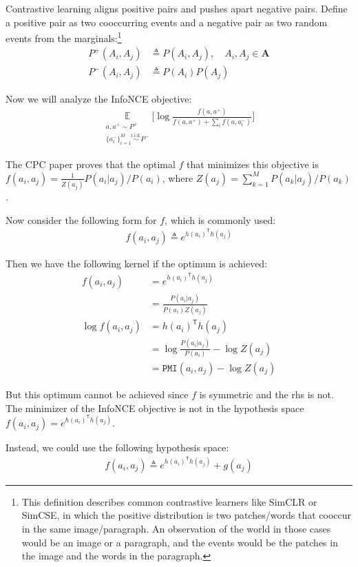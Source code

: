 \documentclass{article}
\theoremstyle{plain}
\theoremstyle{definition}
\theoremstyle{remark}
\newcommand{\transpose}{\mathsf{T}}
\newcommand*{\iidsim}{\overset{\text{i.i.d.}}{\sim}}
\begin{document}
Contrastive learning aligns positive pairs and pushes apart negative pairs. Define a positive pair as two cooccurring events and a negative pair as two random events from the marginals:\footnote{This definition describes common contrastive learners like SimCLR or SimCSE, in which the positive distribution is two patches/words that cooccur in the same image/paragraph. An observation of the world in those cases would be an image or a paragraph, and the events would be the patches in the image and the words in the paragraph.}
\begin{align}
    P^+(A_i,A_j) &\triangleq P(A_i,A_j), \quad A_i, A_j \in \mathbf{A}\\
    P^-(A_i,A_j) &\triangleq P(A_i)P(A_j)
\end{align}

Now we will analyze the InfoNCE objective:
\begin{align}
    \underset{\substack{
    a,a^+ \sim P^+ \\
    \{a^-_i\}_{i=1}^{M} \iidsim P^-
    }}{\mathbb{E}} \Bigg[\log \frac{f(a,a^+)}{f(a,a^+) + \sum_i f(a,a_i^-)} \Bigg]
\end{align}


The CPC paper proves that the optimal $f$ that minimizes this objective is $f(a_i,a_j) = \frac{1}{Z(a_j)}P(a_i | a_j)/P(a_i)$, where $Z(a_j) = \sum_{k=1}^M P(a_k | a_j)/P(a_k)$.

Now consider the following form for $f$, which is commonly used:
\begin{align}
    f(a_i,a_j) \triangleq e^{h(a_i)^\transpose h(a_j)}
\end{align}

Then we have the following kernel if the optimum is achieved:
\begin{align}
    f(a_i,a_j) &= e^{h(a_i)^\transpose h(a_j)}\\
    &= \frac{P(a_i | a_j)}{P(a_i)Z(a_j)}\\
    \log f(a_i,a_j) &= h(a_i)^\transpose h(a_j)\\
    &= \log \frac{P(a_i | a_j)}{P(a_i)} - \log Z(a_j)\\
    &= \texttt{PMI}(a_i,a_j) - \log Z(a_j)
\end{align}

But this optimum cannot be achieved since $f$ is symmetric and the rhs is not. The minimizer of the InfoNCE objective is not in the hypothesis space $f(a_i, a_j) = e^{h(a_i)^\transpose h(a_j)}$.

Instead, we could use the following hypothesis space:
\begin{align}
    f(a_i,a_j) \triangleq e^{h(a_i)^\transpose h(a_j)} + g(a_j)
\end{align}
\end{document}
